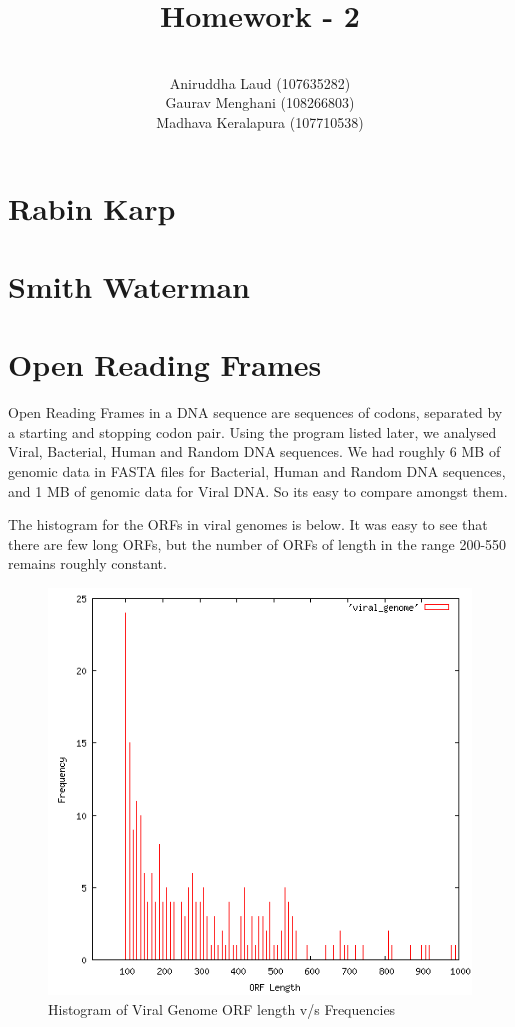\documentclass{article}
\title{Homework - 2}
\author{\\
        Aniruddha Laud (107635282)\\
        Gaurav Menghani (108266803)\\
        Madhava Keralapura (107710538)\\}
\begin{document}
\maketitle

\clearpage

\tableofcontents

\clearpage

\section{Rabin Karp}

\clearpage

\section{Smith Waterman}
\clearpage

\section{Open Reading Frames}
Open Reading Frames in a DNA sequence are sequences of codons, separated by a starting and stopping codon pair. Using the program listed later, we analysed Viral, Bacterial, Human and Random DNA sequences. We had roughly 6 MB of genomic data in FASTA files for Bacterial, Human and Random DNA sequences, and 1 MB of genomic data for Viral DNA. So its easy to compare amongst them.

The histogram for the ORFs in viral genomes is below. It was easy to see that there are few long ORFs, but the number of ORFs of length in the range 200-550 remains roughly constant.

\begin{figure}[htp]
\centering
\includegraphics[scale=0.5]{viral_genome.png}
\caption{Histogram of Viral Genome ORF length v/s Frequencies}\label{fig:fs}
\end{figure}
\end{document}
